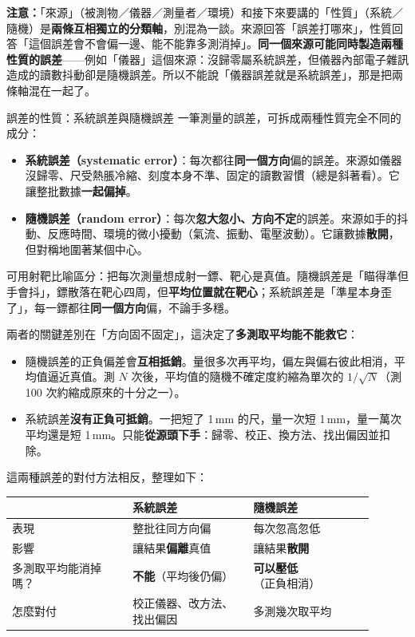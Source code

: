 \documentclass[11pt]{article}
\begin{document}
\textbf{注意：}「來源」（被測物／儀器／測量者／環境）和接下來要講的「性質」（系統／隨機）是\textbf{兩條互相獨立的分類軸}，別混為一談。來源回答「誤差打哪來」，性質回答「這個誤差會不會偏一邊、能不能靠多測消掉」。\textbf{同一個來源可能同時製造兩種性質的誤差}——例如「儀器」這個來源：沒歸零屬系統誤差，但儀器內部電子雜訊造成的讀數抖動卻是隨機誤差。所以不能說「儀器誤差就是系統誤差」，那是把兩條軸混在一起了。


\begin{補充框}{誤差的性質：系統誤差與隨機誤差}
一筆測量的誤差，可拆成兩種性質完全不同的成分：
\begin{itemize}\setlength{\itemsep}{2pt}
\item \textbf{系統誤差（systematic error）}：每次都往\textbf{同一個方向}偏的誤差。來源如儀器沒歸零、尺受熱脹冷縮、刻度本身不準、固定的讀數習慣（總是斜著看）。它讓整批數據\textbf{一起偏掉}。
\item \textbf{隨機誤差（random error）}：每次\textbf{忽大忽小、方向不定}的誤差。來源如手的抖動、反應時間、環境的微小擾動（氣流、振動、電壓波動）。它讓數據\textbf{散開}，但對稱地圍著某個中心。
\end{itemize}

可用射靶比喻區分：把每次測量想成射一鏢、靶心是真值。隨機誤差是「瞄得準但手會抖」，鏢散落在靶心四周，但\textbf{平均位置就在靶心}；系統誤差是「準星本身歪了」，每一鏢都往\textbf{同一個方向}偏，不論手多穩。

兩者的關鍵差別在「方向固不固定」，這決定了\textbf{多測取平均能不能救它}：
\begin{itemize}\setlength{\itemsep}{2pt}
\item 隨機誤差的正負偏差會\textbf{互相抵銷}。量很多次再平均，偏左與偏右彼此相消，平均值逼近真值。測 $N$ 次後，平均值的隨機不確定度約縮為單次的 $1/\sqrt{N}$（測 100 次約縮成原來的十分之一）。
\item 系統誤差\textbf{沒有正負可抵銷}。一把短了 1\,mm 的尺，量一次短 1\,mm，量一萬次平均還是短 1\,mm。只能\textbf{從源頭下手}：歸零、校正、換方法、找出偏因並扣除。
\end{itemize}
\end{補充框}

這兩種誤差的對付方法相反，整理如下：

\begin{center}
\renewcommand{\arraystretch}{1.35}
\begin{tabular}{p{0.30\linewidth} p{0.30\linewidth} p{0.30\linewidth}}
\hline
 & \textbf{系統誤差} & \textbf{隨機誤差} \\
\hline
表現 & 整批往同方向偏 & 每次忽高忽低 \\
影響 & 讓結果\textbf{偏離}真值 & 讓結果\textbf{散開} \\
多測取平均能消掉嗎？ & \textbf{不能}（平均後仍偏） & \textbf{可以壓低}（正負相消） \\
怎麼對付 & 校正儀器、改方法、找出偏因 & 多測幾次取平均 \\
\hline
\end{tabular}
\end{center}
\end{document}
